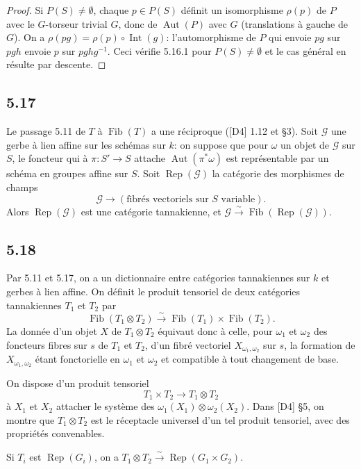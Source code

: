 \documentclass[12pt,a4paper]{article}
\theoremstyle{plain}
\theoremstyle{definition}
\theoremstyle{remark}
\DeclareMathOperator{\Aut}{Aut}
\DeclareMathOperator{\Rep}{Rep}
\DeclareMathOperator{\Int}{Int}
\DeclareMathOperator{\Fib}{Fib}
\begin{document}
\begin{proof}
Si $P(S) 
\neq 
\emptyset$, chaque $p 
\in P(S)$ définit un isomorphisme $\rho(p)$ de $P$ avec le $G$-torseur trivial $G$, donc de $\Aut(P)$ avec $G$ (translations à gauche de $G$). On a $\rho(pg) = 
\rho(p) 
\circ 
\Int(g)$: l'automorphisme de $P$ qui envoie $pg$ sur $pgh$ envoie $p$ sur $pghg^{-1}$. Ceci vérifie 5.16.1 pour $P(S) 
\neq 
\emptyset$ et le cas général en résulte par descente.
\end{proof}

\subsection*{5.17}
Le passage 5.11 de $T$ à $\Fib(T)$ a une réciproque ([D4] 1.12 et §3). Soit $\mathcal{G}$ une gerbe à lien affine sur les schémas sur $k$: on suppose que pour $\omega$ un objet de $\mathcal{G}$ sur $S$, le foncteur qui à $\pi: S' 
\to S$ attache $\Aut(\pi^*\omega)$ est représentable par un schéma en groupes affine sur $S$. Soit $\Rep(\mathcal{G})$ la catégorie des morphismes de champs
\[
\mathcal{G} 
\longrightarrow (\text{fibrés vectoriels sur } S \text{ variable}).
\]
Alors $\Rep(\mathcal{G})$ est une catégorie tannakienne, et $\mathcal{G} 
\xrightarrow{\sim} 
\Fib(\Rep(\mathcal{G}))$.

\subsection*{5.18}
Par 5.11 et 5.17, on a un dictionnaire entre catégories tannakiennes sur $k$ et gerbes à lien affine. On définit le produit tensoriel de deux catégories tannakiennes $T_1$ et $T_2$ par
\[
\Fib(T_1 
\otimes T_2) 
\xrightarrow{\sim} 
\Fib(T_1) 
\times 
\Fib(T_2).
\]
La donnée d'un objet $X$ de $T_1 
\otimes T_2$ équivaut donc à celle, pour $\omega_1$ et $\omega_2$ des foncteurs fibres sur $s$ de $T_1$ et $T_2$, d'un fibré vectoriel $X_{\omega_1,\omega_2}$ sur $s$, la formation de $X_{\omega_1,\omega_2}$ étant fonctorielle en $\omega_1$ et $\omega_2$ et compatible à tout changement de base.

On dispose d'un produit tensoriel
\[
T_1 
\times T_2 
\longrightarrow T_1 
\otimes T_2
\]
à $X_1$ et $X_2$ attacher le système des $\omega_1(X_1) 
\otimes 
\omega_2(X_2)$. Dans [D4] §5, on montre que $T_1 
\otimes T_2$ est le réceptacle universel d'un tel produit tensoriel, avec des propriétés convenables.

Si $T_i$ est $\Rep(G_i)$, on a $T_1 
\otimes T_2 
\xrightarrow{\sim} 
\Rep(G_1 
\times G_2)$.
\end{document}

